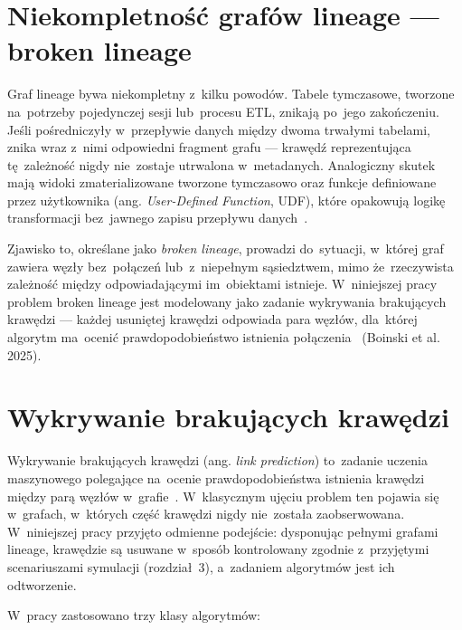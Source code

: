\documentclass[polish,master,a4paper,oneside]{ppfcmthesis}
\begin{document}
\section{Niekompletność grafów lineage — broken lineage}
\label{sec:broken_lineage}

Graf lineage bywa niekompletny z~kilku powodów. Tabele tymczasowe,
tworzone na~potrzeby pojedynczej sesji lub~procesu ETL, znikają po~jego
zakończeniu. Jeśli pośredniczyły w~przepływie danych między dwoma trwałymi
tabelami, znika wraz z~nimi odpowiedni fragment grafu — krawędź
reprezentująca tę~zależność nigdy nie~zostaje utrwalona w~metadanych.
Analogiczny skutek mają widoki zmaterializowane tworzone tymczasowo oraz
funkcje definiowane przez użytkownika (ang. \emph{User-Defined Function},
UDF), które opakowują logikę transformacji bez~jawnego zapisu przepływu
danych~\cite{Yamada2023}.

Zjawisko to, określane jako \emph{broken lineage}, prowadzi do~sytuacji,
w~której graf zawiera węzły bez~połączeń lub~z~niepełnym sąsiedztwem,
mimo że~rzeczywista zależność między odpowiadającymi im~obiektami istnieje.
W~niniejszej pracy problem broken lineage jest modelowany jako zadanie
wykrywania brakujących krawędzi — każdej usuniętej krawędzi odpowiada para
węzłów, dla~której algorytm ma~ocenić prawdopodobieństwo istnienia
połączenia~ (Boinski et al. 2025)\cite{Boinski2025}.


\section{Wykrywanie brakujących krawędzi}
\label{sec:link_prediction}

Wykrywanie brakujących krawędzi (ang. \emph{link prediction}) to~zadanie
uczenia maszynowego polegające na~ocenie prawdopodobieństwa istnienia
krawędzi między parą węzłów w~grafie~\cite{KohanMarzagao2023}. W~klasycznym
ujęciu problem ten pojawia się w~grafach, w~których część krawędzi nigdy
nie~została zaobserwowana. W~niniejszej pracy przyjęto odmienne podejście:
dysponując pełnymi grafami lineage, krawędzie są usuwane w~sposób
kontrolowany zgodnie z~przyjętymi scenariuszami symulacji (rozdział~3),
a~zadaniem algorytmów jest ich odtworzenie.

W~pracy zastosowano trzy klasy algorytmów:
\end{document}
